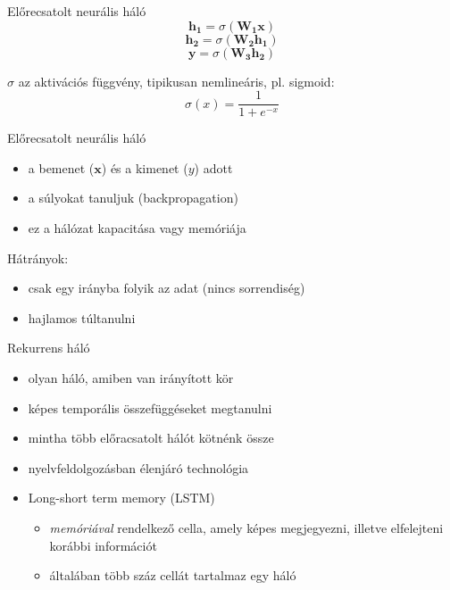 \documentclass[bigger]{beamer}
\begin{document}
\begin{frame}{Előrecsatolt neurális háló}
    \begin{equation*}
        \mathbf{h_1} = \sigma (\mathbf{W_1 x})
    \end{equation*}
    \begin{equation*}
        \mathbf{h_2} = \sigma (\mathbf{W_2 h_1})
    \end{equation*}
    \begin{equation*}
        \mathbf{y} = \sigma (\mathbf{W_3 h_2})
    \end{equation*}

$\sigma$ az aktivációs függvény, tipikusan nemlineáris, pl. sigmoid:
    \begin{equation*}
        \sigma(x) = \frac{1}{1 + e^{-x}}
    \end{equation*}

\end{frame}

\begin{frame}{Előrecsatolt neurális háló}
    \begin{itemize}
        \item a bemenet ($\mathbf{x}$) és a kimenet ($y$) adott
        \item a súlyokat tanuljuk (backpropagation)
        \item ez a hálózat kapacitása vagy memóriája
    \end{itemize}
    Hátrányok:
    \begin{itemize}
        \item csak egy irányba folyik az adat (nincs sorrendiség)
        \item hajlamos túltanulni
    \end{itemize}
\end{frame}

\begin{frame}{Rekurrens háló}
    \begin{itemize}
        \item olyan háló, amiben van irányított kör
        \item képes temporális összefüggéseket megtanulni
        \item mintha több előracsatolt hálót kötnénk össze
        \item nyelvfeldolgozásban élenjáró technológia
        \item Long-short term memory (LSTM)
            \begin{itemize}
                \item \emph{memóriával} rendelkező cella, amely képes megjegyezni, illetve elfelejteni korábbi információt
                \item általában több száz cellát tartalmaz egy háló
            \end{itemize}
    \end{itemize}
\end{frame}
\end{document}
